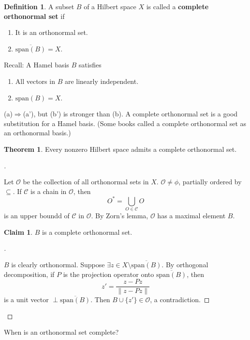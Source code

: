 \documentclass{article}
\theoremstyle{definition}
\newtheorem{thm}{Theorem}
\newtheorem{dfn}{Definition}
\newtheorem*{clm}{Claim}
\newenvironment{proofs}[1][\proofname]{%
  \begin{proof}[#1]$ $\par\nobreak\ignorespaces
}{%
  \end{proof}
}
\begin{document}
\begin{dfn}
	A subset $B$ of a Hilbert space $X$ is called a \textbf{complete orthonormal set} if 
	\begin{enumerate}
		\item[(a)] It is an orthonormal set.

		\item[(b)] $\overline{\text{span}(B)} = X$.
	\end{enumerate}
\end{dfn}

Recall: A Hamel basis $B$ satisfies 
\begin{enumerate}
	\item[(a')] All vectors in $B$ are linearly independent.

	\item[(b')] $\text{span}(B) = X$.
\end{enumerate}

(a)$\Rightarrow$(a'), but (b') is stronger than (b).
A complete orthonormal set is a good substitution for a Hamel basis.
(Some books called a complete orthonormal set as an orthonormal basis.)

\begin{thm}
	Every nonzero Hilbert space admits a complete orthonormal set.
\end{thm}

\begin{proofs}
	Let $\mathcal{O}$ be the collection of all orthonormal sets in $X$.
	$\mathcal{O} \neq \phi$, partially ordered by $\subseteq$.
	If $\mathcal{C}$ is a chain in $\mathcal{O}$, then
	\[
		O^* = \bigcup_{O \in \mathcal{C}} O
	\]
	is an upper boundd of $\mathcal{C}$ in $\mathcal{O}$.
	By Zorn's lemma, $\mathcal{O}$ has a maximal element $B$.
	
	\begin{clm}
		$B$ is a complete orthonormal set.
	\end{clm}

	\begin{proofs}
		$B$ is clearly orthonormal.
		Suppose $\exists z \in X \setminus \overline{\text{span}(B)}$.
		By orthogonal decomposition, if $P$ is the projection operator onto $\overline{\text{span}(B)}$, then
		\[
			z' = \frac{z - {Pz}}{\|z - P z\|}
		\]
		is a unit vector $\perp \overline{\text{span}(B)}$.
		Then $B \cup \{z'\} \in \mathcal{O}$, a contradiction.
	\end{proofs}
\end{proofs}

When is an orthonormal set complete?
\end{document}
